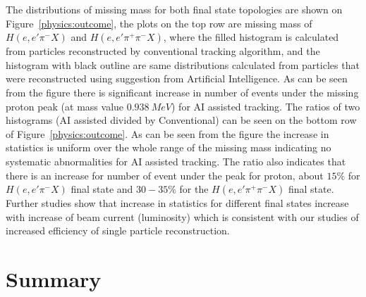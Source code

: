 The distributions of missing mass for both final state topologies are shown on Figure~\ref{physics:outcome}, the plots 
on the top row are missing mass of $H(e,e'\pi^-X)$ and $H(e,e'\pi^+\pi^-X)$, where the filled histogram is calculated from 
particles reconstructed by conventional tracking algorithm, and the histogram with black outline are same distributions 
calculated from particles that were reconstructed using suggestion from Artificial Intelligence. As can be seen from the figure 
there is significant increase in number of events under the missing proton peak (at mass value $0.938~MeV$) for AI assisted
tracking. The ratios of two histograms (AI assisted divided by Conventional) can be seen on the bottom row of 
Figure~\ref{physics:outcome}. As can be seen from the figure the increase in statistics is uniform over the whole range of the 
missing mass indicating no systematic abnormalities for AI assisted tracking. The ratio also indicates that there is an increase 
for number of event under the peak for proton, about $15\%$ for $H(e,e'\pi^-X)$ final state and $30-35\%$ for the $H(e,e'\pi^+\pi^-X)$
final state. Further studies show that increase in statistics for different final states increase with increase of beam current (luminosity) 
which is consistent with our studies of increased efficiency of single particle reconstruction. 


\section{Summary}

